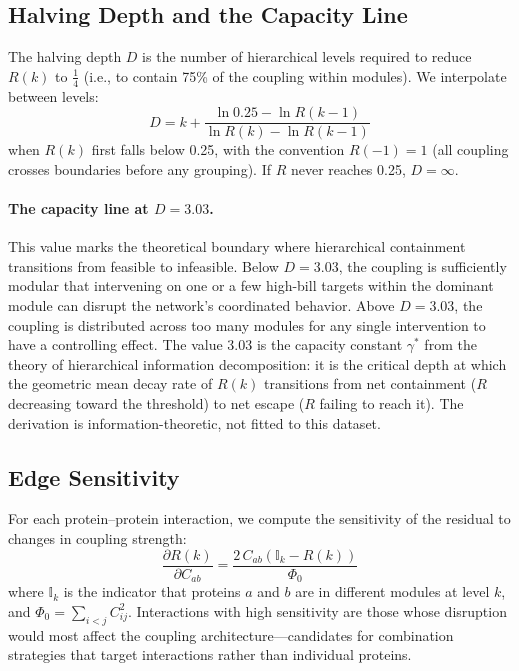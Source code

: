 \documentclass[11pt,a4paper]{article}
\begin{document}
\subsection{Halving Depth and the Capacity Line}

The halving depth $D$ is the number of hierarchical levels required to reduce $R(k)$ to $\frac{1}{4}$ (i.e., to contain 75\% of the coupling within modules). We interpolate between levels:
\begin{equation}
D = k + \frac{\ln 0.25 - \ln R(k-1)}{\ln R(k) - \ln R(k-1)}
\label{eq:depth}
\end{equation}
when $R(k)$ first falls below 0.25, with the convention $R(-1) = 1$ (all coupling crosses boundaries before any grouping). If $R$ never reaches 0.25, $D = \infty$.

\paragraph{The capacity line at $D = 3.03$.} This value marks the theoretical boundary where hierarchical containment transitions from feasible to infeasible. Below $D = 3.03$, the coupling is sufficiently modular that intervening on one or a few high-bill targets within the dominant module can disrupt the network's coordinated behavior. Above $D = 3.03$, the coupling is distributed across too many modules for any single intervention to have a controlling effect. The value 3.03 is the capacity constant $\gamma^*$ from the theory of hierarchical information decomposition: it is the critical depth at which the geometric mean decay rate of $R(k)$ transitions from net containment ($R$ decreasing toward the threshold) to net escape ($R$ failing to reach it). The derivation is information-theoretic, not fitted to this dataset.

\subsection{Edge Sensitivity}

For each protein--protein interaction, we compute the sensitivity of the residual to changes in coupling strength:
\begin{equation}
\frac{\partial R(k)}{\partial C_{ab}} = \frac{2\,C_{ab}\left(\mathbb{I}_k - R(k)\right)}{\Phi_0}
\label{eq:sens}
\end{equation}
where $\mathbb{I}_k$ is the indicator that proteins $a$ and $b$ are in different modules at level $k$, and $\Phi_0 = \sum_{i<j} C_{ij}^2$. Interactions with high sensitivity are those whose disruption would most affect the coupling architecture---candidates for combination strategies that target interactions rather than individual proteins.
\end{document}
